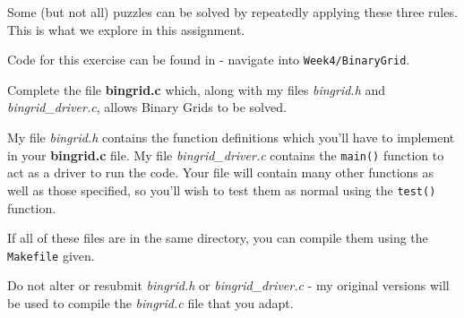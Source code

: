 \noindent Some (but not all) puzzles can be solved by repeatedly applying these three rules.
This is what we explore in this assignment.

\begin{exercise}

Code for this exercise can be found in  - navigate into \verb^Week4/BinaryGrid^.

Complete the file {\bf bingrid.c} which, along with my files {\em
bingrid.h} and {\em bingrid\_driver.c}, allows Binary Grids to be solved.

\noindent My file {\em bingrid.h} contains the function definitions
which you'll have to implement in your {\bf bingrid.c} file.  My file
{\em bingrid\_driver.c} contains the \verb^main()^ function to act as
a driver to run the code.  Your file will contain many other functions
as well as those specified, so you'll wish to test them as normal using
the \verb^test()^ function.

\noindent If all of these files are in the same directory, you can
compile them using the \verb^Makefile^ given.

\noindent Do not alter or resubmit {\em bingrid.h} or {\em
bingrid\_driver.c} - my original versions will be used to compile the
{\em bingrid.c} file that you adapt.

\end{exercise}
